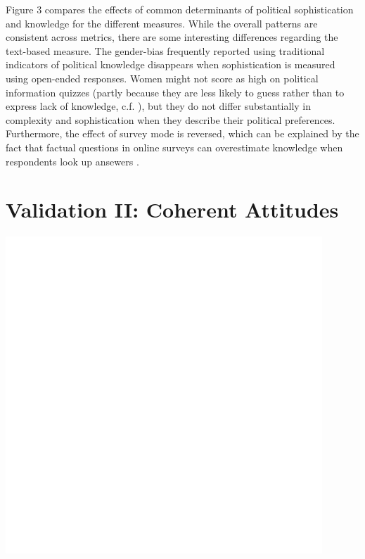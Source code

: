 \documentclass[a0,landscape]{a0poster}
\begin{document}
\begin{multicols}{4}
Figure 3 compares the effects of common determinants of political sophistication and knowledge for the different measures. While the overall patterns are consistent across metrics, there are some interesting differences regarding the text-based measure. The gender-bias frequently reported using traditional indicators of political knowledge disappears when sophistication is measured using open-ended responses. Women might not score as high on political information quizzes (partly because they are less likely to guess rather than to express lack of knowledge, c.f. \citealt{mondak2004knowledge}), but they do not differ substantially in complexity and sophistication when they describe their political preferences. Furthermore, the effect of survey mode is reversed, which can be explained by the fact that factual questions in online surveys can overestimate knowledge when respondents look up ansewers \citep[see also][]{clifford2016cheating}.

\section*{Validation II: Coherent Attitudes}
\begin{center}
\includegraphics[width=\linewidth]{../fig/models2.pdf}
\end{center}


\end{multicols}
\end{document}
